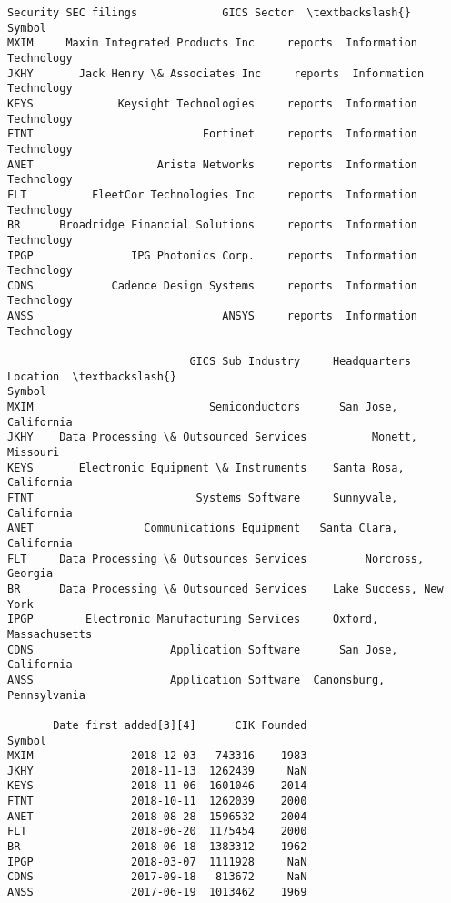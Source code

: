 \documentclass[11pt]{article}
\begin{document}
    
    \begin{Verbatim}[commandchars=\\\{\}]
                              Security SEC filings             GICS Sector  \textbackslash{}
Symbol                                                                       
MXIM     Maxim Integrated Products Inc     reports  Information Technology   
JKHY       Jack Henry \& Associates Inc     reports  Information Technology   
KEYS             Keysight Technologies     reports  Information Technology   
FTNT                          Fortinet     reports  Information Technology   
ANET                   Arista Networks     reports  Information Technology   
FLT          FleetCor Technologies Inc     reports  Information Technology   
BR      Broadridge Financial Solutions     reports  Information Technology   
IPGP               IPG Photonics Corp.     reports  Information Technology   
CDNS            Cadence Design Systems     reports  Information Technology   
ANSS                             ANSYS     reports  Information Technology   

                            GICS Sub Industry     Headquarters Location  \textbackslash{}
Symbol                                                                    
MXIM                           Semiconductors      San Jose, California   
JKHY    Data Processing \& Outsourced Services          Monett, Missouri   
KEYS       Electronic Equipment \& Instruments    Santa Rosa, California   
FTNT                         Systems Software     Sunnyvale, California   
ANET                 Communications Equipment   Santa Clara, California   
FLT     Data Processing \& Outsources Services         Norcross, Georgia   
BR      Data Processing \& Outsourced Services    Lake Success, New York   
IPGP        Electronic Manufacturing Services     Oxford, Massachusetts   
CDNS                     Application Software      San Jose, California   
ANSS                     Application Software  Canonsburg, Pennsylvania   

       Date first added[3][4]      CIK Founded  
Symbol                                          
MXIM               2018-12-03   743316    1983  
JKHY               2018-11-13  1262439     NaN  
KEYS               2018-11-06  1601046    2014  
FTNT               2018-10-11  1262039    2000  
ANET               2018-08-28  1596532    2004  
FLT                2018-06-20  1175454    2000  
BR                 2018-06-18  1383312    1962  
IPGP               2018-03-07  1111928     NaN  
CDNS               2017-09-18   813672     NaN  
ANSS               2017-06-19  1013462    1969  
    \end{Verbatim}
\end{document}
